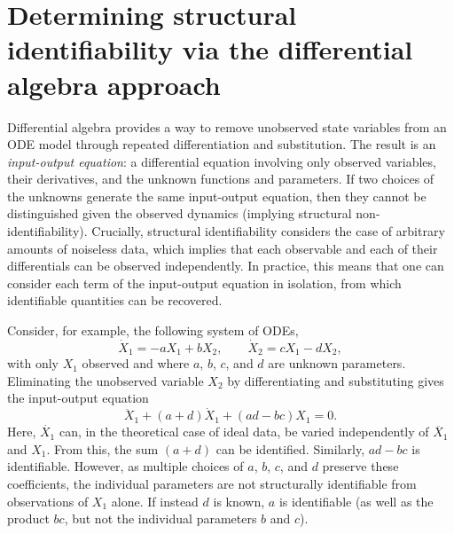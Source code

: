 \documentclass{article}
\theoremstyle{plain}
\theoremstyle{definition}
\begin{document}
{\section{Determining structural identifiability via the differential algebra approach} \label{sec:diffalg}


Differential algebra provides a way to remove unobserved state variables from an ODE model through repeated differentiation and substitution. The result is an \emph{input-output equation}: a differential equation involving only observed variables, their derivatives, and the unknown functions and parameters. If two choices of the unknowns generate the same input-output equation, then they cannot be distinguished given the observed dynamics (implying structural non-identifiability). Crucially, structural identifiability considers the case of arbitrary amounts of noiseless data, which implies that each observable and each of their differentials can be observed independently. In practice, this means that one can consider each term of the input-output equation in isolation, from which identifiable quantities can be recovered.

Consider, for example, the following system of ODEs,
\begin{equation*}
    \dot X_1=-aX_1+bX_2,\qquad
    \dot X_2=cX_1-dX_2,
\end{equation*}
with only $X_1$ observed and where $a$, $b$, $c$, and $d$ are unknown parameters. Eliminating the unobserved variable $X_2$ by differentiating and substituting gives the input-output equation
\begin{equation*}
    \ddot X_1+(a+d)\dot X_1+(ad-bc)X_1=0.
\end{equation*}
Here, $\dot{X_1}$ can, in the theoretical case of ideal data, be varied independently of $\ddot{X_1}$ and $X_1$. From this, the sum $(a+d)$ can be identified. Similarly, $ad-bc$ is identifiable. However, as multiple choices of $a$, $b$, $c$, and $d$ preserve these coefficients, the individual parameters are not structurally identifiable from observations of $X_1$ alone. If instead $d$ is known, $a$ is identifiable (as well as the product $bc$, but not the individual parameters $b$ and $c$).


}
\end{document}
